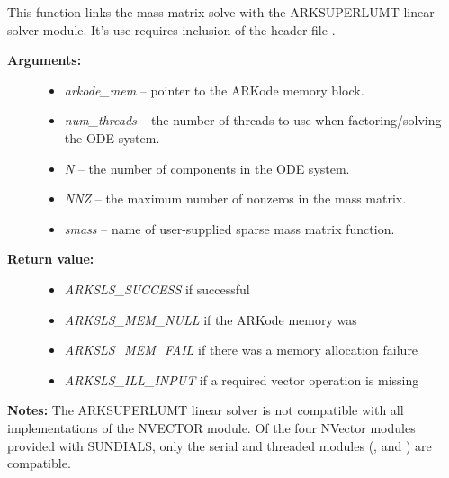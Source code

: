 \documentclass[letterpaper,10pt,english]{sphinxmanual}
\begin{document}
\begin{fulllineitems}
\label{c_interface/User_callable:c.ARKMassSuperLUMT}
This function links the mass matrix solve with the ARKSUPERLUMT
linear solver module.  It's use requires inclusion of the header
file .
\begin{description}
\item[{\textbf{Arguments:}}] \leavevmode\begin{itemize}
\item {} 
\emph{arkode\_mem} -- pointer to the ARKode memory block.

\item {} 
\emph{num\_threads} -- the number of threads to use when
factoring/solving the ODE system.

\item {} 
\emph{N} -- the number of components in the ODE system.

\item {} 
\emph{NNZ} -- the maximum number of nonzeros in the mass matrix.

\item {} 
\emph{smass} -- name of user-supplied sparse mass matrix function.

\end{itemize}

\item[{\textbf{Return value:}}] \leavevmode\begin{itemize}
\item {} 
\emph{ARKSLS\_SUCCESS}   if successful

\item {} 
\emph{ARKSLS\_MEM\_NULL}  if the ARKode memory was 

\item {} 
\emph{ARKSLS\_MEM\_FAIL}  if there was a memory allocation failure

\item {} 
\emph{ARKSLS\_ILL\_INPUT} if a required vector operation is missing

\end{itemize}

\end{description}

\textbf{Notes:}  The ARKSUPERLUMT linear solver is not compatible with all
implementations of the NVECTOR module. Of the four NVector
modules provided with SUNDIALS, only the serial and threaded
modules ({\hyperref[nvectors/NVector_Serial:nvectors-nvserial]{\emph{}}}, {\hyperref[nvectors/NVector_OpenMP:nvectors-openmp]{\emph{}}} and
{\hyperref[nvectors/NVector_Pthreads:nvectors-pthreads]{\emph{}}}) are compatible.

\end{fulllineitems}
\end{document}
